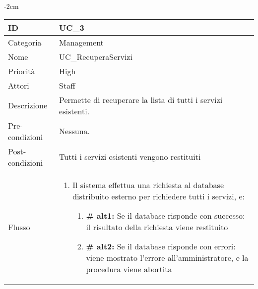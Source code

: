 \begin{center}
\begin{table}[bp]
    \centering
    \addtolength{\leftskip} {-2cm}
\begin{tabular}{ |p{2.6cm}|p{13cm}|  }
\hline
ID & UC\_3 \\\hline
Categoria & Management\\\hline
Nome & UC\_RecuperaServizi\\\hline
Priorità & High \\\hline
Attori &  Staff \\\hline
Descrizione & Permette di recuperare la lista di tutti i servizi esistenti.\\\hline
Pre-condizioni &  Nessuna.\\\hline
Post-condizioni &  Tutti i servizi esistenti vengono restituiti\\\hline
Flusso &  	\begin{enumerate}
			\item Il sistema effettua una richiesta al database distribuito esterno per richiedere tutti i servizi, e:
				\begin{enumerate}[label*=\arabic*.]
				\item \textbf{\# alt1:} Se il database risponde con successo: il risultato della richiesta viene restituito
				\item \textbf{\# alt2:} Se il database risponde con errori: viene mostrato l'errore all'amministratore, e la procedura viene abortita
				\end{enumerate}
		\end{enumerate}\\\hline
\end{tabular}
\label{table_use_case:3}\newline
\end{table}


\end{center}
